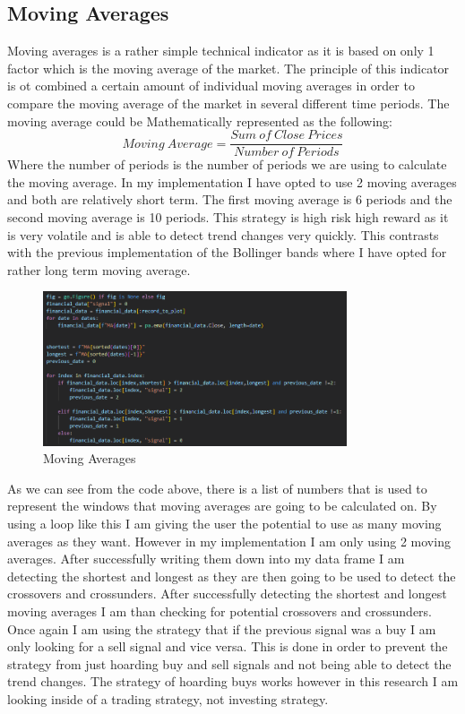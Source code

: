 \documentclass{imc-inf}
\begin{document}
	\subsection{Moving Averages}
	Moving averages is a rather simple technical indicator as it is based on only 1 factor which is the moving average of the market. 
	The principle of this indicator is ot combined a certain amount of individual moving averages in order to compare the moving average of the market in several 
	different time periods. The moving average could be Mathematically represented as the following:
	\begin{equation}
		Moving\ Average = \frac{Sum\ of\ Close\ Prices}{Number\ of\ Periods}
	\end{equation}
	Where the number of periods is the number of periods we are using to calculate the moving average.
	In my implementation I have opted to use 2 moving averages and both are relatively short term. The first moving average is 6 periods and the second moving average is 10 periods.
	This strategy is high risk high reward as it is very volatile and is able to detect trend changes very quickly. This contrasts with the previous implementation of the 
	Bollinger bands where I have opted for rather long term moving average.
	\begin{figure}[h!]
		\centering
		\includegraphics[width=0.8\textwidth]{moving_averages_code.png}
		\caption{Moving Averages}
		\label{fig:moving_averages}
		
	\end{figure}
	
	As we can see from the code above, there is a list of numbers that is used to represent the windows that moving averages are going to be calculated on. 
	By using a loop like this I am giving the user the potential to use as many moving averages as they want. However in my implementation I am only using 2 moving averages.
	After successfully writing them down into my data frame I am detecting the shortest and longest as they are then going to be used to detect the crossovers and crossunders.
	After successfully detecting the shortest and longest moving averages I am than checking for potential crossovers and crossunders. Once again
	I am using the strategy that if the previous signal was a buy I am only looking for a sell signal and vice versa. This is done in order to prevent the strategy from just hoarding 
	buy and sell signals and not being able to detect the trend changes. The strategy of hoarding buys works however in this research I am looking inside of
	a trading strategy, not investing strategy.
\end{document}
